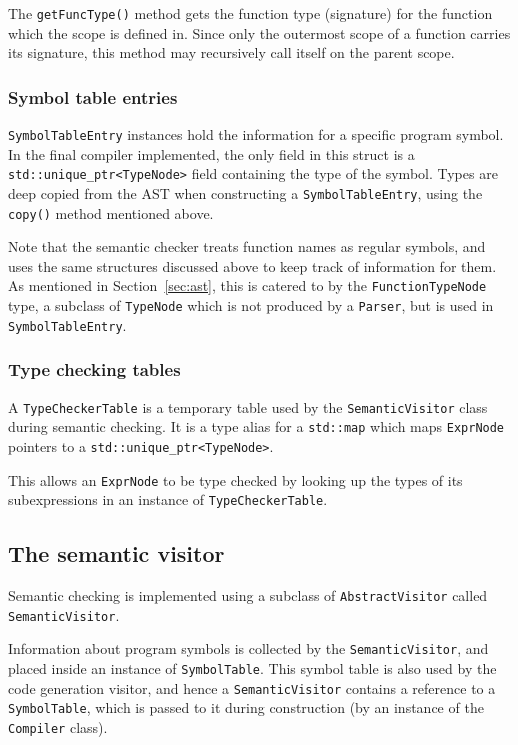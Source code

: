 \documentclass[11pt,a4paper]{scrartcl}
\begin{document}
The \verb|getFuncType()| method gets the function type (signature) for the function which the scope is defined in. Since only the outermost scope of a function carries its signature, this method may recursively call itself on the parent scope.

\subsubsection{Symbol table entries}

\verb|SymbolTableEntry| instances hold the information for a specific program symbol. In the final compiler implemented, the only field in this struct is a \verb|std::unique_ptr<TypeNode>| field containing the type of the symbol. Types are deep copied from the AST when constructing a \verb|SymbolTableEntry|, using the \verb|copy()| method mentioned above.

Note that the semantic checker treats function names as regular symbols, and uses the same structures discussed above to keep track of information for them. As mentioned in Section~\ref{sec:ast}, this is catered to by the \verb|FunctionTypeNode| type, a subclass of \verb|TypeNode| which is not produced by a \verb|Parser|, but is used in \verb|SymbolTableEntry|.

\subsubsection{Type checking tables}

A \verb|TypeCheckerTable| is a temporary table used by the \verb|SemanticVisitor| class during semantic checking. It is a type alias for a \verb|std::map| which maps \verb|ExprNode| pointers to a \verb|std::unique_ptr<TypeNode>|.

This allows an \verb|ExprNode| to be type checked by looking up the types of its subexpressions in an instance of \verb|TypeCheckerTable|.

\subsection{The semantic visitor}

Semantic checking is implemented using a subclass of \Verb|AbstractVisitor| called \Verb|SemanticVisitor|.

Information about program symbols is collected by the \Verb|SemanticVisitor|, and placed inside an instance of \Verb|SymbolTable|. This symbol table is also used by the code generation visitor, and hence a \Verb|SemanticVisitor| contains a reference to a \Verb|SymbolTable|, which is passed to it during construction (by an instance of the \verb|Compiler| class).
\end{document}
